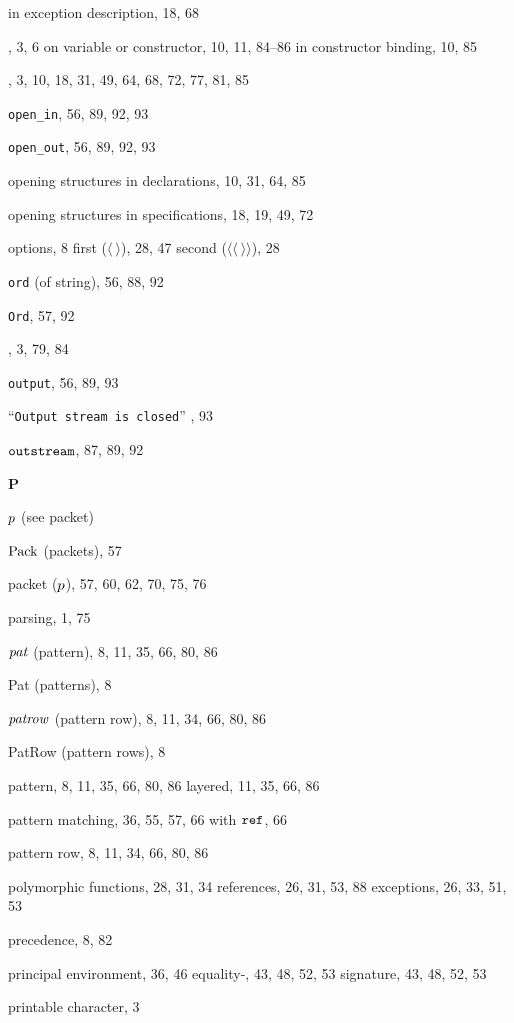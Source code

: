 \begin{theindex}
\subitem in exception description, 18, 68
\item \OP, 3, 6
\subitem on variable or constructor, 10, 11, 84--86
\subitem in constructor binding, 10, 85
\item \OPEN, 3, 10, 18, 31, 49, 64, 68, 72, 77, 81, 85
\item \verb+open_in+, 56, 89, 92, 93
\item \verb+open_out+, 56, 89, 92, 93
\item opening structures in declarations, 10, 31, 64, 85
\item opening structures in specifications, 18, 19, 49, 72
\item options, 8
\subitem first ($\langle\ \rangle$), 28, 47
\subitem second ($\langle\langle\ \rangle\rangle$), 28
\item {\tt ord} (of string), 56, 88, 92
\item {\tt Ord}, 57, 92
\item \ORELSE, 3, 79, 84
\item {\tt output}, 56, 89, 93
\item ``{\tt Output stream is closed}'' , 93
\item $\mbox{\tt outstream}$, 87, 89, 92
\indexspace
\parbox{65mm}{\hfil{\large\bf P}\hfil}
\indexspace
\item $p$ (see packet) 
\item ${\rm Pack}$ (packets), 57
\item packet ($p$), 57, 60, 62, 70, 75, 76
\item parsing, 1, 75
\item ${\it pat}$ (pattern), 8, 11, 35, 66, 80, 86
\item Pat (patterns), 8
\item ${\it patrow}$ (pattern row), 8, 11, 34, 66, 80, 86
\item PatRow (pattern rows), 8
\item pattern, 8, 11, 35, 66, 80, 86
\subitem layered, 11, 35, 66, 86
\item pattern matching, 36, 55, 57, 66
\subitem with $\mbox{\tt ref}$, 66
\item pattern row, 8, 11, 34, 66, 80, 86
\item polymorphic 
\subitem functions, 28, 31, 34
\subitem references, 26, 31, 53, 88
\subitem exceptions, 26, 33, 51, 53
\item precedence, 8, 82
\item principal 
\subitem environment, 36, 46
\subitem equality-, 43, 48, 52, 53
\subitem signature, 43, 48, 52, 53
\item printable character, 3

\end{theindex}
